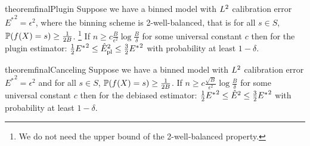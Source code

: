 
\begin{restatable}{theorem}{finalPlugin}
\label{thm:final-plugin}
  Suppose we have a binned model with $L^2{}$ calibration error ${E^*}^2 = \epsilon^2$, where the binning scheme is 2-well-balanced, that is for all $s \in S$, $\mathbb{P}(f(X) = s) \geq \frac{1}{2B}$.
  \footnote{We do not need the upper bound of the 2-well-balanced property.}
  If $n \geq c\frac{B}{\epsilon^2}\log{\frac{B}{\delta}}$ for some universal constant $c$ then for the plugin estimator: $\frac{1}{2} {E^*}^2 \leq \hat{E}_{\textup{pl}}^2{} \leq \frac{3}{2} {E^*}^2$ with probability at least $1 - \delta$.
\end{restatable}

\begin{restatable}{theorem}{finalCanceling}
\label{thm:final-ours}
  Suppose we have a binned model with $L^2{}$ calibration error ${E^*}^2 = \epsilon^2$ and for all $s \in S$, $\mathbb{P}(f(X) = s) \geq \frac{1}{2B}$. If $n \geq c\frac{\sqrt{B}}{\epsilon^2}\log{\frac{B}{\delta}}$ for some universal constant $c$ then for the debiased estimator: $\frac{1}{2} {E^*}^2 \leq \hat{E}^2{} \leq \frac{3}{2}{E^*}^2$ with probability at least $1 - \delta$.
\end{restatable}


